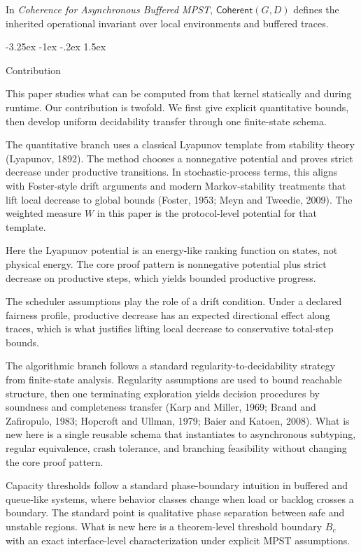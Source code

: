 \documentclass[a4paper,10pt,twocolumn,english]{article}
\makeatletter
\renewcommand{\subsection}{\@startsection{subsection}{2}{\z@}%
  {-3.25ex \@plus -1ex \@minus -.2ex}%
  {1.5ex}%
  {\raggedright\normalfont\normalsize\bfseries}}
\numberwithin{equation}{section}
\theoremstyle{paperdef}
\theoremstyle{paperplain}
\theoremstyle{paperdef}
\theoremstyle{paperremark}
\newcommand{\Coherent}{\ensuremath{\mathsf{Coherent}}}
\newcommand{\Bc}{\ensuremath{B_c}}
\makeatother
\begin{document}
In \emph{Coherence for Asynchronous Buffered MPST}, $\Coherent(G,D)$ defines the inherited operational
invariant over local environments and buffered traces.

\subsection{Contribution}

This paper studies what can be computed from that kernel statically and during runtime. Our contribution is twofold. We first give explicit quantitative bounds, then develop uniform
decidability transfer through one finite-state schema.

The quantitative branch uses a classical Lyapunov template from stability theory (Lyapunov, 1892).
The method chooses a nonnegative potential and proves strict decrease under productive transitions.
In stochastic-process terms, this aligns with Foster-style drift arguments and modern Markov-stability
treatments that lift local decrease to global bounds (Foster, 1953; Meyn and Tweedie, 2009). The
weighted measure $W$ in this paper is the protocol-level potential for that template.

Here the Lyapunov potential is an energy-like ranking function on states, not physical energy. The
core proof pattern is nonnegative potential plus strict decrease on productive steps, which yields
bounded productive progress.

The scheduler assumptions play the role of a drift condition. Under a declared fairness profile,
productive decrease has an expected directional effect along traces, which is what justifies
lifting local decrease to conservative total-step bounds.

The algorithmic branch follows a standard regularity-to-decidability strategy from finite-state
analysis. Regularity assumptions are used to bound reachable structure, then one terminating
exploration yields decision procedures by soundness and completeness transfer (Karp and Miller,
1969; Brand and Zafiropulo, 1983; Hopcroft and Ullman, 1979; Baier and Katoen, 2008). What is new
here is a single reusable schema that instantiates to asynchronous subtyping, regular equivalence,
crash tolerance, and branching feasibility without changing the core proof pattern.

Capacity thresholds follow a standard phase-boundary intuition in buffered and queue-like systems,
where behavior classes change when load or backlog crosses a boundary. The standard point is
qualitative phase separation between safe and unstable regions. What is new here is a theorem-level
threshold boundary $\Bc$ with an exact interface-level characterization under explicit MPST assumptions.
\end{document}
